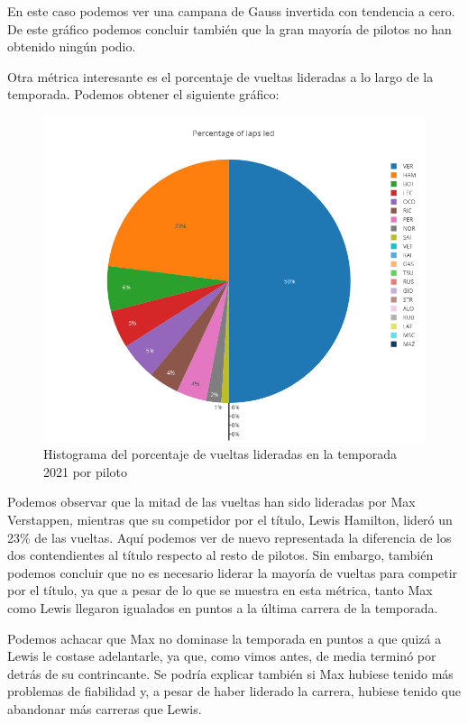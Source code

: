 \documentclass[12pt,twoside,titlepage]{report}
\begin{document}
En este caso podemos ver una campana de Gauss invertida con tendencia a cero. De este gráfico podemos concluir también que la gran mayoría de pilotos no han obtenido ningún podio.

Otra métrica interesante es el porcentaje de vueltas lideradas a lo largo de la temporada. Podemos obtener el siguiente gráfico:

\begin{figure}[H]
	\includegraphics[scale=0.4]{results/seasonanalysis/percLapsLed2021.png}
	\centering
	\caption{Histograma del porcentaje de vueltas lideradas en la temporada 2021 por piloto}
	\label{fig:percLapsLed2021}
	\centering
\end{figure}

Podemos observar que la mitad de las vueltas han sido lideradas por Max Verstappen, mientras que su competidor por el título, Lewis Hamilton, lideró un 23\% de las vueltas. Aquí podemos ver de nuevo representada la diferencia de los dos contendientes al título respecto al resto de pilotos. Sin embargo, también podemos concluir que no es necesario liderar la mayoría de vueltas para competir por el título, ya que a pesar de lo que se muestra en esta métrica, tanto Max como Lewis llegaron igualados en puntos a la última carrera de la temporada. 

Podemos achacar que Max no dominase la temporada en puntos a que quizá a Lewis le costase adelantarle, ya que, como vimos antes, de media terminó por detrás de su contrincante. Se podría explicar también si Max hubiese tenido más problemas de fiabilidad y, a pesar de haber liderado la carrera, hubiese tenido que abandonar más carreras que Lewis.
\end{document}
